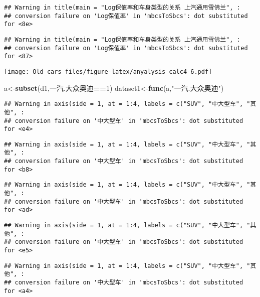 \documentclass[]{article}
\newenvironment{Shaded}{\begin{snugshade}}{\end{snugshade}}
\newcommand{\KeywordTok}[1]{\textcolor[rgb]{0.13,0.29,0.53}{\textbf{#1}}}
\newcommand{\DecValTok}[1]{\textcolor[rgb]{0.00,0.00,0.81}{#1}}
\newcommand{\StringTok}[1]{\textcolor[rgb]{0.31,0.60,0.02}{#1}}
\newcommand{\OperatorTok}[1]{\textcolor[rgb]{0.81,0.36,0.00}{\textbf{#1}}}
\newcommand{\NormalTok}[1]{#1}
\begin{document}
\begin{verbatim}
## Warning in title(main = "Log保值率和车身类型的关系 上汽通用雪佛兰", :
## conversion failure on 'Log保值率' in 'mbcsToSbcs': dot substituted for <8e>
\end{verbatim}

\begin{verbatim}
## Warning in title(main = "Log保值率和车身类型的关系 上汽通用雪佛兰", :
## conversion failure on 'Log保值率' in 'mbcsToSbcs': dot substituted for <87>
\end{verbatim}

\texttt{[image: Old\_cars\_files/figure-latex/anyalysis calc4-6.pdf]}

\begin{Shaded}
\begin{Highlighting}[]
\NormalTok{a<-}\KeywordTok{subset}\NormalTok{(d1,一汽.大众奥迪}\OperatorTok{==}\DecValTok{1}\NormalTok{)}
\NormalTok{dataset1<-}\KeywordTok{func}\NormalTok{(a,}\StringTok{"一汽.大众奥迪"}\NormalTok{)}
\end{Highlighting}
\end{Shaded}

\begin{verbatim}
## Warning in axis(side = 1, at = 1:4, labels = c("SUV", "中大型车", "其他", :
## conversion failure on '中大型车' in 'mbcsToSbcs': dot substituted for <e4>
\end{verbatim}

\begin{verbatim}
## Warning in axis(side = 1, at = 1:4, labels = c("SUV", "中大型车", "其他", :
## conversion failure on '中大型车' in 'mbcsToSbcs': dot substituted for <b8>
\end{verbatim}

\begin{verbatim}
## Warning in axis(side = 1, at = 1:4, labels = c("SUV", "中大型车", "其他", :
## conversion failure on '中大型车' in 'mbcsToSbcs': dot substituted for <ad>
\end{verbatim}

\begin{verbatim}
## Warning in axis(side = 1, at = 1:4, labels = c("SUV", "中大型车", "其他", :
## conversion failure on '中大型车' in 'mbcsToSbcs': dot substituted for <e5>
\end{verbatim}

\begin{verbatim}
## Warning in axis(side = 1, at = 1:4, labels = c("SUV", "中大型车", "其他", :
## conversion failure on '中大型车' in 'mbcsToSbcs': dot substituted for <a4>
\end{verbatim}
\end{document}
